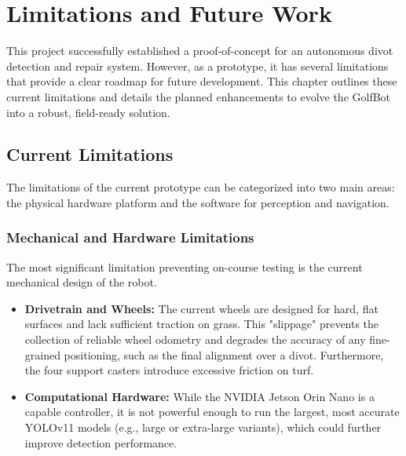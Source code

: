 \chapter{Limitations and Future Work}
\label{chap:future_work}

This project successfully established a proof-of-concept for an autonomous divot detection and repair system. However, as a prototype, it has several limitations that provide a clear roadmap for future development. This chapter outlines these current limitations and details the planned enhancements to evolve the GolfBot into a robust, field-ready solution.

\section{Current Limitations}
The limitations of the current prototype can be categorized into two main areas: the physical hardware platform and the software for perception and navigation.

\subsection{Mechanical and Hardware Limitations}
The most significant limitation preventing on-course testing is the current mechanical design of the robot.
\begin{itemize}
    \item \textbf{Drivetrain and Wheels:} The current wheels are designed for hard, flat surfaces and lack sufficient traction on grass. This "slippage" prevents the collection of reliable wheel odometry and degrades the accuracy of any fine-grained positioning, such as the final alignment over a divot. Furthermore, the four support casters introduce excessive friction on turf.
    \item \textbf{Computational Hardware:} While the NVIDIA Jetson Orin Nano is a capable controller, it is not powerful enough to run the largest, most accurate YOLOv11 models (e.g., large or extra-large variants), which could further improve detection performance.
\end{itemize}

